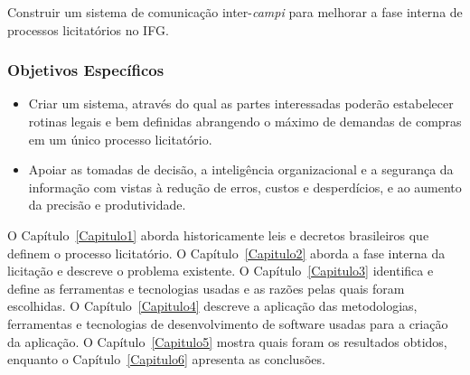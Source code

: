 Construir um sistema de comunicação inter-\textit{campi} para melhorar a fase interna de processos licitatórios no IFG.

\subsubsection*{Objetivos Específicos}
\begin{itemize}
    \item Criar um sistema, através do qual as partes interessadas poderão estabelecer rotinas legais e bem definidas abrangendo o máximo de demandas de compras em um único processo licitatório.
    \item Apoiar as tomadas de decisão, a inteligência organizacional e a segurança da informação com vistas à redução de erros, custos e desperdícios, e ao aumento da precisão e produtividade.
\end{itemize}

O Capítulo~\ref{Capitulo1} aborda historicamente leis e decretos brasileiros que definem o processo licitatório.
O Capítulo~\ref{Capitulo2} aborda a fase interna da licitação e descreve o problema existente.
O Capítulo~\ref{Capitulo3} identifica e define as ferramentas e tecnologias usadas e as razões pelas quais foram escolhidas.
O Capítulo~\ref{Capitulo4} descreve a aplicação das metodologias, ferramentas e tecnologias de desenvolvimento de software usadas para a criação da aplicação.
O Capítulo~\ref{Capitulo5} mostra quais foram os resultados obtidos, enquanto o Capítulo~\ref{Capitulo6} apresenta as conclusões.

